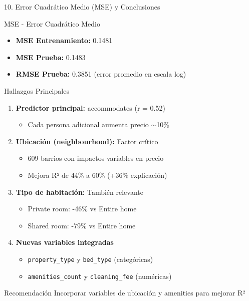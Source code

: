 \documentclass{beamer}
\begin{document}
\begin{frame}{10. Error Cuadrático Medio (MSE) y Conclusiones}
  
  \begin{block}{MSE - Error Cuadrático Medio}
    \begin{itemize}
      \item \textbf{MSE Entrenamiento:} 0.1481
      \item \textbf{MSE Prueba:} 0.1483
      \item \textbf{RMSE Prueba:} 0.3851 (error promedio en escala log)
    \end{itemize}
  \end{block}
  
  \vspace{0.3cm}
  
  \begin{block}{Hallazgos Principales}
    \begin{enumerate}
      \item \textbf{Predictor principal:} accommodates (r = 0.52)
      \begin{itemize}
        \item Cada persona adicional aumenta precio $\sim$10\%
      \end{itemize}
      \item \textbf{Ubicación (neighbourhood):} Factor crítico
      \begin{itemize}
        \item 609 barrios con impactos variables en precio
        \item Mejora R² de 44\% a 60\% (+36\% explicación)
      \end{itemize}
      \item \textbf{Tipo de habitación:} También relevante
      \begin{itemize}
        \item Private room: -46\% vs Entire home
        \item Shared room: -79\% vs Entire home
      \end{itemize}
      \item \textbf{Nuevas variables integradas}
      \begin{itemize}
        \item \texttt{property\_type} y \texttt{bed\_type} (categóricas)
        \item \texttt{amenities\_count} y \texttt{cleaning\_fee} (numéricas)
      \end{itemize}
    \end{enumerate}
  \end{block}
  
  \vspace{0.2cm}
  
  \begin{alertblock}{Recomendación}
    Incorporar variables de ubicación y amenities para mejorar R²
  \end{alertblock}
\end{frame}
\end{document}
